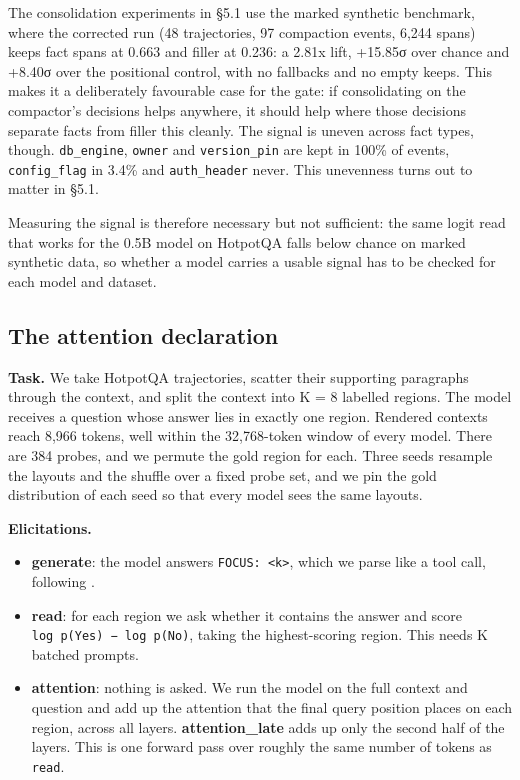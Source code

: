 \documentclass[10pt]{article}
\providecommand{\tightlist}{\setlength{\itemsep}{0pt}\setlength{\parskip}{0pt}}
\begin{document}
The consolidation experiments in §5.1 use the marked synthetic benchmark, where the corrected
run (48 trajectories, 97 compaction events, 6,244 spans) keeps fact spans at 0.663 and filler
at 0.236: a 2.81x lift, +15.85σ over chance and +8.40σ over the positional control, with no
fallbacks and no empty keeps. This makes it a deliberately favourable case for the gate: if
consolidating on the compactor's decisions helps anywhere, it should help where those
decisions separate facts from filler this cleanly. The signal is uneven across fact types,
though. \texttt{db\_engine}, \texttt{owner} and
\texttt{version\_pin} are kept in 100\% of events, \texttt{config\_flag} in 3.4\% and \texttt{auth\_header} never.
This unevenness turns out to matter in §5.1.

Measuring the signal is therefore necessary but not sufficient: the same logit read that
works for the 0.5B model on HotpotQA falls below chance on marked synthetic data, so whether a
model carries a usable signal has to be checked for each model and dataset.

\subsection{The attention declaration}

\textbf{Task.} We take HotpotQA trajectories, scatter their supporting paragraphs through the
context, and split the context into K = 8 labelled regions. The model receives a question
whose answer lies in exactly one region. Rendered contexts reach 8,966 tokens, well within
the 32,768-token window of every model. There are 384 probes, and we permute the gold region
for each. Three seeds resample the layouts and the shuffle over a fixed probe set, and we pin
the gold distribution of each seed so that every model sees the same layouts.

\textbf{Elicitations.}

\begin{itemize}
\tightlist
\item
  \textbf{generate}: the model answers \texttt{FOCUS:\ \textless{}k\textgreater{}}, which we parse like a tool call, following
  \citet{ho2026attention}.
\item
  \textbf{read}: for each region we ask whether it contains the answer and score
  \texttt{log\ p(Yes)\ −\ log\ p(No)}, taking the highest-scoring region. This needs K batched prompts.
\item
  \textbf{attention}: nothing is asked. We run the model on the full context and question and add
  up the attention that the final query position places on each region, across all layers.
  \textbf{attention\_late} adds up only the second half of the layers. This is one forward pass
  over roughly the same number of tokens as \texttt{read}.
\end{itemize}
\end{document}
